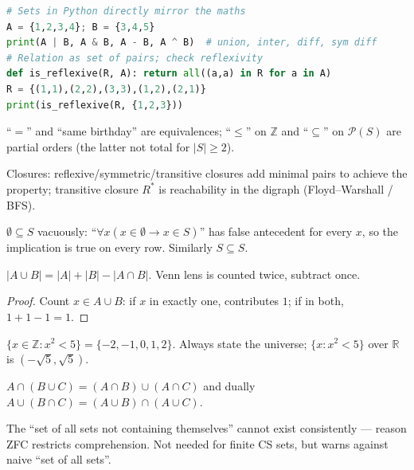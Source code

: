 \begin{lstlisting}[language=Python]
# Sets in Python directly mirror the maths
A = {1,2,3,4}; B = {3,4,5}
print(A | B, A & B, A - B, A ^ B)  # union, inter, diff, sym diff
# Relation as set of pairs; check reflexivity
def is_reflexive(R, A): return all((a,a) in R for a in A)
R = {(1,1),(2,2),(3,3),(1,2),(2,1)}
print(is_reflexive(R, {1,2,3}))
\end{lstlisting}

\begin{example}
``$=$'' and ``same birthday'' are equivalences; ``$\le$'' on $\mathbb{Z}$ and ``$\subseteq$'' on $\mathcal{P}(S)$ are partial orders (the latter not total for $|S|\ge2$).
\end{example}

Closures: reflexive/symmetric/transitive closures add minimal pairs to achieve the property; transitive closure $R^*$ is reachability in the digraph (Floyd--Warshall / BFS).


\begin{remark}
$\emptyset\subseteq S$ vacuously: ``$\forall x(x\in\emptyset\to x\in S)$'' has false antecedent for every $x$, so the implication is true on every row. Similarly $S\subseteq S$.
\end{remark}

\begin{theorem}
$|A\cup B|=|A|+|B|-|A\cap B|$. Venn lens is counted twice, subtract once.
\end{theorem}
\begin{proof} Count $x\in A\cup B$: if $x$ in exactly one, contributes $1$; if in both, $1+1-1=1$.
\end{proof}


\begin{example}
$\{x\in\mathbb{Z}:x^2<5\}=\{-2,-1,0,1,2\}$. Always state the universe; $\{x:x^2<5\}$ over $\mathbb{R}$ is $(-\sqrt5,\sqrt5)$.
\end{example}

\begin{theorem}[Distributivity]
$A\cap(B\cup C)=(A\cap B)\cup(A\cap C)$ and dually $A\cup(B\cap C)=(A\cup B)\cap(A\cup C)$.
\end{theorem}

\begin{remark}
The ``set of all sets not containing themselves'' cannot exist consistently --- reason ZFC restricts comprehension. Not needed for finite CS sets, but warns against naive ``set of all sets''.
\end{remark}

